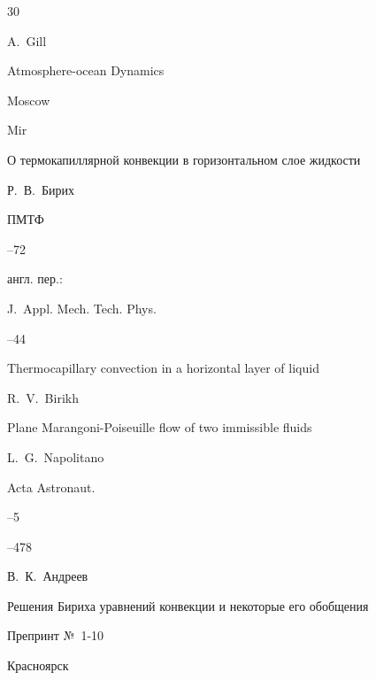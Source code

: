 {\begin{thebibliography}{30}


\misctransl

\by A.~Gill

\book Atmosphere-ocean Dynamics

\publaddr Moscow

\publ Mir









\paper О термокапиллярной конвекции в горизонтальном слое жидкости

\by Р.~В.~Бирих

\jour ПМТФ



--72

\transl

англ. пер.:~

\jour J.~Appl. Mech. Tech. Phys.




--44

\paper Thermocapillary convection in a horizontal layer of liquid

\by R.~V.~Birikh 




\paper Plane Marangoni-Poiseuille flow of two immissible fluids

\by L.~G.~Napolitano

\jour Acta Astronaut. 



–5

--478




\by В.~К.~Андреев

\preprint Решения Бириха уравнений конвекции и некоторые его обобщения

\preprintinfo Препринт №~1-10

\publaddr Красноярск


\end{thebibliography}}
